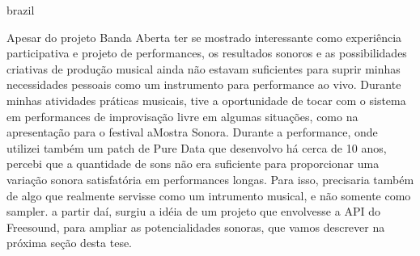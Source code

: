 \begin{otherlanguage*}{brazil}

Apesar do projeto Banda Aberta ter se mostrado interessante como experiência participativa e projeto de performances, os resultados sonoros e as possibilidades criativas de produção musical ainda não estavam suficientes para suprir minhas necessidades pessoais como um instrumento para performance ao vivo. Durante minhas atividades práticas musicais, tive a oportunidade de tocar com o sistema em performances de improvisação livre em algumas situações, como na apresentação para o festival aMostra Sonora. Durante a performance, onde utilizei também um patch de Pure Data que desenvolvo há cerca de 10 anos, percebi que a quantidade de sons não era suficiente para proporcionar uma variação sonora satisfatória em performances longas. Para isso, precisaria também de algo que realmente servisse como um intrumento musical, e não somente como sampler. a partir daí, surgiu a idéia de um projeto que envolvesse a API do Freesound, para ampliar as potencialidades sonoras, que vamos descrever na próxima seção desta tese.




\end{otherlanguage*}

